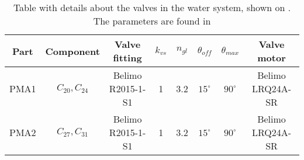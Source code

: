 \begin{table}[]
\centering
\begin{tabular}{c|c|c|c|c|c|c|c}
Part & Component 		& Valve fitting 	& $k_{vs}$  & $n_{gl}$  & $\theta_{off}$ & $\theta_{max}$ & Valve motor 	 \\ \hline
PMA1 & $C_{20}, C_{24}$ & Belimo R2015-1-S1 & 1 		& 3.2 		& $15^\circ$	 & $90^\circ$ 	  & Belimo LRQ24A-SR \\
PMA2 & $C_{27}, C_{31}$ & Belimo R2015-1-S1 & 1 		& 3.2 		& $15^\circ$   	 & $90^\circ$ 	  & Belimo LRQ24A-SR
\end{tabular}
\caption{Table with details about the valves in the water system, shown on . The parameters are found in \citep{Belimo1, Belimo2}}
\label{tab:pip_detail}
\end{table}

